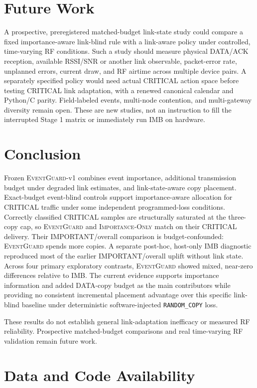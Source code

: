 \documentclass[11pt]{article}
\newcommand{\EG}{\textsc{EventGuard}}
\newcommand{\IO}{\textsc{Importance-Only}}
\begin{document}
\section{Future Work}\label{sec:future-work}

A prospective, preregistered matched-budget link-state study could compare a fixed importance-aware link-blind rule with a link-aware policy under controlled, time-varying RF conditions. Such a study should measure physical DATA/ACK reception, available RSSI/SNR or another link observable, packet-error rate, unplanned errors, current draw, and RF airtime across multiple device pairs. A separately specified policy would need actual CRITICAL action space before testing CRITICAL link adaptation, with a renewed canonical calendar and Python/C parity. Field-labeled events, multi-node contention, and multi-gateway diversity remain open. These are new studies, not an instruction to fill the interrupted Stage 1 matrix or immediately run IMB on hardware.

\section{Conclusion}\label{sec:conclusion}

Frozen \EG{}-v1 combines event importance, additional transmission budget under degraded link estimates, and link-state-aware copy placement. Exact-budget event-blind controls support importance-aware allocation for CRITICAL traffic under some independent programmed-loss conditions. Correctly classified CRITICAL samples are structurally saturated at the three-copy cap, so \EG{} and \IO{} match on their CRITICAL delivery. Their IMPORTANT/overall comparison is budget-confounded: \EG{} spends more copies. A separate post-hoc, host-only IMB diagnostic reproduced most of the earlier IMPORTANT/overall uplift without link state. Across four primary exploratory contrasts, \EG{} showed mixed, near-zero differences relative to IMB. The current evidence supports importance information and added DATA-copy budget as the main contributors while providing no consistent incremental placement advantage over this specific link-blind baseline under deterministic software-injected \texttt{RANDOM\_COPY} loss.

These results do not establish general link-adaptation inefficacy or measured RF reliability. Prospective matched-budget comparisons and real time-varying RF validation remain future work.

\section*{Data and Code Availability}
\end{document}
